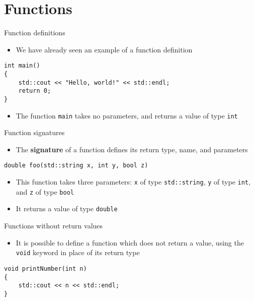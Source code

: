 \part{Functions}
\frame{\partpage}

\begin{frame}[fragile]{Function definitions}
    \begin{itemize}
        \item We have already seen an example of a function definition
    \end{itemize}
    \begin{lstlisting}
int main()
{
    std::cout << "Hello, world!" << std::endl;
    return 0;
}
    \end{lstlisting}
    \begin{itemize}
        \item The function \lstinline{main} takes no parameters, and returns a value of type \lstinline{int}
    \end{itemize}
\end{frame}

\begin{frame}[fragile]{Function signatures}
    \begin{itemize}
        \item The \textbf{signature} of a function defines its return type, name, and parameters
    \end{itemize}
    \begin{lstlisting}
double foo(std::string x, int y, bool z)
    \end{lstlisting}
    \pause
    \begin{itemize}
        \item This function takes three parameters: \pause
        \lstinline{x} of type \lstinline{std::string}, \pause
        \lstinline{y} of type \lstinline{int}, \pause
        and \lstinline{z} of type \lstinline{bool} \pause
        \item It returns a value of type \lstinline{double}
    \end{itemize}
\end{frame}

\begin{frame}[fragile]{Functions without return values}
    \begin{itemize}
        \item It is possible to define a function which does not return a value, using the \lstinline{void} keyword
        in place of its return type
    \end{itemize}
    \pause
    \begin{lstlisting}
void printNumber(int n)
{
    std::cout << n << std::endl;
}
    \end{lstlisting}
\end{frame}

